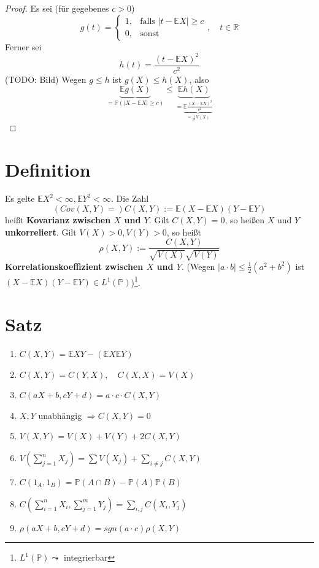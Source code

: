\documentclass[a4paper,11pt,notitlepage]{report}
\newcommand{\R}{{\ensuremath{\mathbb{R}}}}
\newcommand{\Prim}{{\ensuremath{\mathbb{P}}}}
\newcommand{\E}{{\ensuremath{\mathbb{E}}}}
\begin{document}
\begin{proof}
	Es sei (für gegebenes $c>0$)
	$$g(t) = \begin{cases} 1, & \text{falls } |t - \E X | \geq c \\ 0, & \text{sonst}\end{cases}, \quad t \in \R$$
	Ferner sei 
	$$h(t)= \frac{(t - \E X)^2}{c^2}$$
	(TODO: Bild)
	\newline
	Wegen $g \leq h$ ist $g(X) \leq h(X)$, also
	$$\underbrace{\E g(X)}_{= \Prim(|X - \E X| \geq c)} \leq \underbrace{\E h(X)}_{= \underbrace{\E \frac{(X- \E X)^2}{c^2}}_{= \frac{1}{c^2} V(X)}}$$
\end{proof}

\section{Definition}
Es gelte $\E X^2 < \infty, \E Y^2 < \infty$. Die Zahl
$$(Cov(X,Y)=) C(X,Y) := \E (X - \E X) (Y - \E Y)$$
heißt \textbf{Kovarianz zwischen $X$ und $Y$}.
Gilt $C(X,Y)=0$, so heißen $X$ und $Y$ \textbf{unkorreliert}.
Gilt $V(X)>0, V(Y)>0$, so heißt
$$\rho(X,Y):= \frac{C(X,Y)}{\sqrt{V(X)}\sqrt{V(Y)}}$$
\textbf{Korrelationskoeffizient zwischen $X$ und $Y$}.
(Wegen $|a \cdot b| \leq \frac{1}{2} (a^2 + b^2)$ ist $(X-\E X) (Y - \E Y) \in L^1(\Prim)$)\footnote{$L^1(\Prim) \leadsto$ integrierbar}.

\section{Satz}
\begin{enumerate}
	\item $C(X,Y) = \E X Y - (\E X \E Y)$
	\item $C(X,Y) = C(Y,X), \quad C(X,X)=V(X)$
	\item $C(aX+b,cY+d) = a \cdot c \cdot C(X,Y)$
	\item $X,Y$ unabhängig $\Rightarrow C(X,Y) = 0$
	\item $V(X,Y) = V(X)+ V(Y) + 2 C(X,Y)$
	\item $V(\sum\limits_{j=1}^n{X_j}) = \sum{V(X_j)} + \sum\limits_{i \neq j}{C(X,Y)}$
	\item $C(1_A, 1_B) = \Prim(A \cap B) - \Prim(A) \Prim(B)$
	\item $C(\sum\limits_{i=1}^n{X_i}, \sum\limits_{j=1}^m{Y_j}) = \sum\limits_{i,j}{C(X_i, Y_j)}$
	\item $\rho(aX+b, cY+d) = sgn(a \cdot c)\rho(X,Y)$
\end{enumerate}
\end{document}
